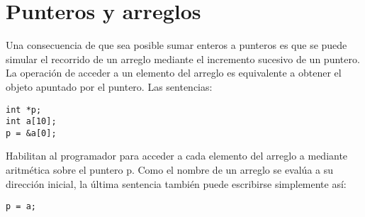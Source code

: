\section{Punteros y arreglos}
Una consecuencia de que sea posible sumar enteros a punteros es que se puede
simular el recorrido de un arreglo mediante el incremento sucesivo de un
puntero. La operación de acceder a un elemento del arreglo es equivalente a
obtener el objeto apuntado por el puntero. Las sentencias:
\begin{lstlisting}
int *p;
int a[10];
p = &a[0];
\end{lstlisting}

Habilitan al programador para acceder a cada elemento del arreglo a mediante
aritmética sobre el puntero p. Como el nombre de un arreglo se evalúa a su
dirección inicial, la última sentencia también puede escribirse simplemente
así:
\begin{lstlisting}
p = a;
\end{lstlisting}

